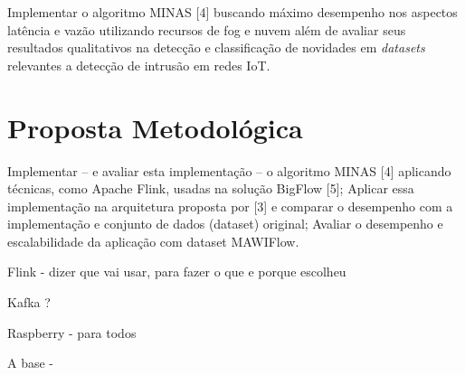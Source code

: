Implementar o algoritmo MINAS [4] buscando máximo desempenho nos aspectos 
latência e vazão utilizando recursos de fog e nuvem além de avaliar seus resultados
qualitativos na detecção e classificação de novidades em \emph{datasets}
relevantes a detecção de intrusão em redes IoT.


\section{Proposta Metodológica}

Implementar  -- e avaliar esta implementação -- o algoritmo MINAS [4] 
aplicando técnicas, como Apache Flink, usadas na solução BigFlow [5];
Aplicar essa implementação na arquitetura proposta por [3] e
comparar o desempenho com a implementação e conjunto de dados (dataset) original;
Avaliar o desempenho e escalabilidade da aplicação com dataset MAWIFlow.

Flink  - dizer que vai usar, para fazer o que e porque escolheu 

Kafka ?

Raspberry - para todos

A base - 

